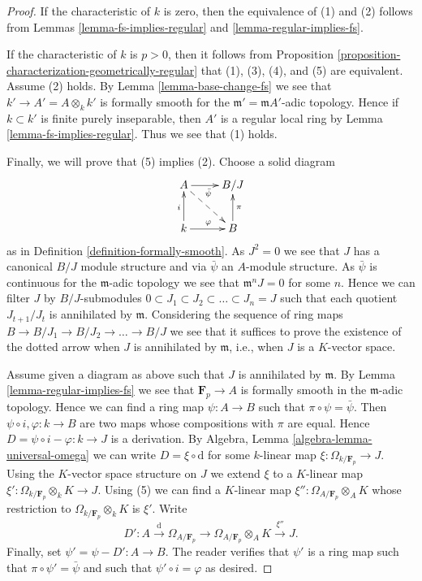 \documentclass[10pt,a4paper]{amsart}
\theoremstyle{plain}
\theoremstyle{definition}
\theoremstyle{remark}
\numberwithin{equation}{subsection}
\begin{document}
\begin{proof}
If the characteristic of $k$ is zero, then the equivalence of (1) and (2)
follows from
Lemmas \ref{lemma-fs-implies-regular} and \ref{lemma-regular-implies-fs}.

\medskip\noindent
If the characteristic of $k$ is $p > 0$, then it follows from
Proposition \ref{proposition-characterization-geometrically-regular}
that (1), (3), (4), and (5) are equivalent. Assume (2) holds.
By Lemma \ref{lemma-base-change-fs} we see that
$k' \to A' = A \otimes_k k'$ is formally smooth for the
$\mathfrak m' = \mathfrak mA'$-adic topology. Hence if $k \subset k'$ is
finite purely inseparable, then $A'$ is a regular local ring by
Lemma \ref{lemma-fs-implies-regular}. Thus we see that (1) holds.

\medskip\noindent
Finally, we will prove that (5) implies (2). Choose a solid diagram
$$
\xymatrix{
A \ar[r]_{\bar\psi} \ar@{-->}[rd] & B/J \\
k \ar[u]^i \ar[r]^\varphi & B \ar[u]_\pi
}
$$
as in Definition \ref{definition-formally-smooth}. As $J^2 = 0$ we see
that $J$ has a canonical $B/J$ module structure and via $\bar\psi$ an
$A$-module structure. As $\bar\psi$ is continuous for the
$\mathfrak m$-adic topology we see that $\mathfrak m^nJ = 0$ for some $n$.
Hence we can filter $J$ by $B/J$-submodules
$0 \subset J_1 \subset J_2 \subset \ldots \subset J_n = J$
such that each quotient $J_{t + 1}/J_t$ is annihilated by $\mathfrak m$.
Considering the sequence of ring maps
$B \to B/J_1 \to B/J_2 \to \ldots \to B/J$
we see that it suffices to prove the existence of the dotted arrow when
$J$ is annihilated by $\mathfrak m$, i.e., when $J$ is a $K$-vector space.

\medskip\noindent
Assume given a diagram as above such that $J$ is annihilated by $\mathfrak m$.
By Lemma \ref{lemma-regular-implies-fs} we see that $\mathbf{F}_p \to A$ is
formally smooth in the $\mathfrak m$-adic topology. Hence we can find a ring
map $\psi : A \to B$ such that $\pi \circ \psi = \bar \psi$. Then
$\psi \circ i, \varphi : k \to B$ are two maps whose compositions with $\pi$
are equal. Hence $D = \psi \circ i - \varphi : k \to J$ is a derivation.
By Algebra, Lemma \ref{algebra-lemma-universal-omega} we can write
$D = \xi \circ \text{d}$ for some $k$-linear map
$\xi : \Omega_{k/\mathbf{F}_p} \to J$. Using the $K$-vector space structure
on $J$ we extend $\xi$ to a $K$-linear map
$\xi' : \Omega_{k/\mathbf{F}_p} \otimes_k K \to J$.
Using (5) we can find a $K$-linear map
$\xi'' : \Omega_{A/\mathbf{F}_p} \otimes_A K$ whose restriction to
$\Omega_{k/\mathbf{F}_p} \otimes_k K$ is $\xi'$. Write
$$
D' : A \xrightarrow{\text{d}} \Omega_{A/\mathbf{F}_p}
\to \Omega_{A/\mathbf{F}_p} \otimes_A K \xrightarrow{\xi''} J.
$$
Finally, set $\psi' = \psi - D' : A \to B$. The reader verifies that $\psi'$
is a ring map such that $\pi \circ \psi' = \bar \psi$ and such that
$\psi' \circ i = \varphi$ as desired.
\end{proof}
\end{document}
